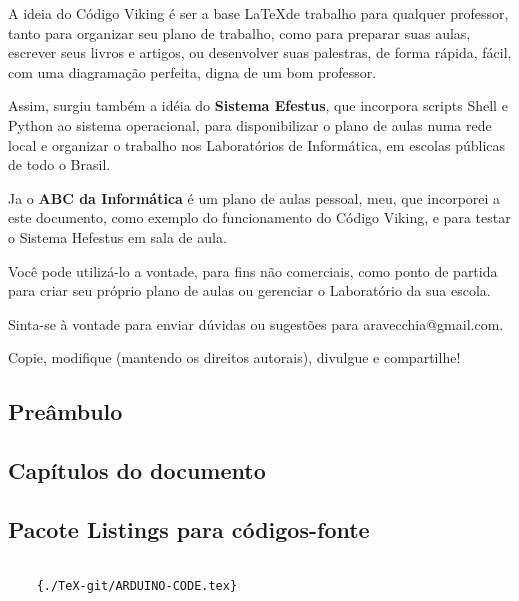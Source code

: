 \large
\begin{multicols}{2}
	A ideia do Código Viking é ser a base \LaTeX \space de trabalho para qualquer professor, tanto para organizar seu plano de trabalho, como para preparar suas aulas, escrever seus livros e artigos, ou desenvolver suas palestras, de forma rápida, fácil, com uma diagramação perfeita, digna de um bom professor.

Assim, surgiu também a idéia do \textbf{Sistema Efestus}, que incorpora scripts Shell e Python ao sistema operacional, para disponibilizar o plano de aulas numa rede local e organizar o trabalho nos Laboratórios de Informática, em escolas públicas de todo o Brasil.

Ja o \textbf{ABC da Informática} é um plano de aulas pessoal, meu, que incorporei a este documento, como exemplo do funcionamento do Código Viking, e para testar o Sistema Hefestus em sala de aula.

Você pode utilizá-lo a vontade, para fins não comerciais, como ponto de partida para criar seu próprio plano de aulas ou gerenciar o Laboratório da sua escola.

Sinta-se à vontade para enviar dúvidas ou sugestões para aravecchia@gmail.com.

Copie, modifique (mantendo os direitos autorais), divulgue e compartilhe!

\vfill\null
\columnbreak

\subsection[Preâmbulo]{Preâmbulo}



\vfill
\columnbreak

\subsection[Capítulos do documento]{Capítulos do documento}



\subsection[Pacote Listings para códigos-fonte]{Pacote Listings para códigos-fonte}

{
	\normalsize
	\begin{verbatim}

	{./TeX-git/ARDUINO-CODE.tex}


\end{verbatim}}
\end{multicols}
